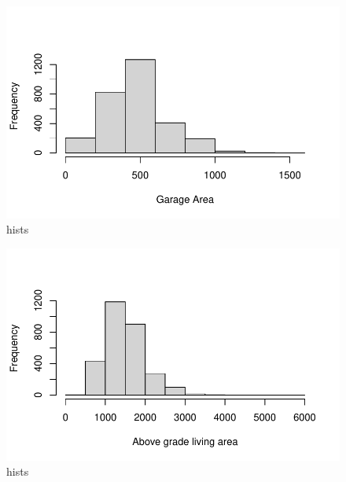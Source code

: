 \documentclass[
  letterpaper,
  DIV=11,
  numbers=noendperiod]{scrartcl}
\begin{document}
\begin{figure}[H]

{\centering \includegraphics{paper_files/figure-pdf/histbox-1.pdf}

}

\caption{hists}

\end{figure}%

\begin{figure}[H]

{\centering \includegraphics{paper_files/figure-pdf/histbox-2.pdf}

}

\caption{hists}

\end{figure}%
\end{document}
